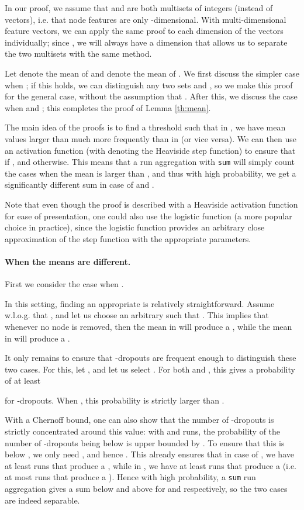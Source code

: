 \documentclass{article}
\begin{document}
In our proof, we assume that  and  are both multisets of integers (instead of vectors), i.e. that node features are only -dimensional. With multi-dimensional feature vectors, we can apply the same proof to each dimension of the vectors individually; since , we will always have a dimension that allows us to separate the two multisets with the same method.

Let  denote the mean of  and  denote the mean of . We first discuss the simpler case when ; if this holds, we can distinguish any two sets  and , so we make this proof for the general case, without the assumption that . After this, we discuss the case when  and ; this completes the proof of Lemma \ref{th:mean}.

The main idea of the proofs is to find a threshold  such that in , we have mean values larger than  much more frequently than in  (or vice versa). We can then use an activation function  (with  denoting the Heaviside step function) to ensure that  if , and  otherwise. This means that a run aggregation with \texttt{sum} will simply count the cases when the mean is larger than , and thus with high probability, we get a significantly different sum in case of  and .

Note that even though the proof is described with a Heaviside activation function for ease of presentation, one could also use the logistic function (a more popular choice in practice), since the logistic function provides an arbitrary close approximation of the step function with the appropriate parameters.

\paragraph{When the means are different.}

First we consider the case when .

In this setting, finding an appropriate  is relatively straightforward. Assume w.l.o.g. that , and let us choose an arbitrary  such that . This implies that whenever no node is removed, then the mean in  will produce a , while the mean in  will produce a .

It only remains to ensure that -dropouts are frequent enough to distinguish these two cases. For this, let , and let us select . For both  and , this gives a probability of at least

for -dropouts. When , this probability is strictly larger than .

With a Chernoff bound, one can also show that the number of -dropouts is strictly concentrated around this value: with  and  runs, the probability of the number of -dropouts being below  is upper bounded by . To ensure that this is below , we only need , and hence . This already ensures that in case of , we have at least  runs that produce a , while in , we have at least  runs that produce a  (i.e. at most  runs that produce a ). Hence with high probability, a \texttt{sum} run aggregation gives a sum below  and above  for  and  respectively, so the two cases are indeed separable.
\end{document}
